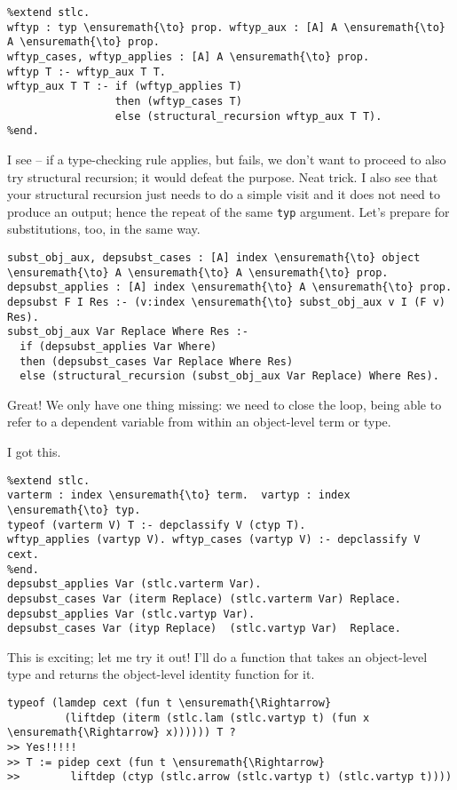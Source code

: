 \begin{verbatim}
%extend stlc.
wftyp : typ \ensuremath{\to} prop. wftyp_aux : [A] A \ensuremath{\to} A \ensuremath{\to} prop.
wftyp_cases, wftyp_applies : [A] A \ensuremath{\to} prop.
wftyp T :- wftyp_aux T T.
wftyp_aux T T :- if (wftyp_applies T)
                 then (wftyp_cases T)
                 else (structural_recursion wftyp_aux T T).
%end.
\end{verbatim}

\heroSTUDENT{} I see -- if a type-checking rule applies, but fails, we don't
want to proceed to also try structural recursion; it would defeat the
purpose. Neat trick. I also see that your structural recursion just
needs to do a simple visit and it does not need to produce an output;
hence the repeat of the same \texttt{typ} argument. Let's prepare for
substitutions, too, in the same way.

\begin{verbatim}
subst_obj_aux, depsubst_cases : [A] index \ensuremath{\to} object \ensuremath{\to} A \ensuremath{\to} A \ensuremath{\to} prop.
depsubst_applies : [A] index \ensuremath{\to} A \ensuremath{\to} prop.
depsubst F I Res :- (v:index \ensuremath{\to} subst_obj_aux v I (F v) Res).
subst_obj_aux Var Replace Where Res :-
  if (depsubst_applies Var Where)
  then (depsubst_cases Var Replace Where Res)
  else (structural_recursion (subst_obj_aux Var Replace) Where Res).
\end{verbatim}

\heroADVISOR{} Great! We only have one thing missing: we need to close the
loop, being able to refer to a dependent variable from within an
object-level term or type.

\heroSTUDENT{} I got this.

\begin{verbatim}
%extend stlc.
varterm : index \ensuremath{\to} term.  vartyp : index \ensuremath{\to} typ.
typeof (varterm V) T :- depclassify V (ctyp T).
wftyp_applies (vartyp V). wftyp_cases (vartyp V) :- depclassify V cext.
%end.
depsubst_applies Var (stlc.varterm Var).
depsubst_cases Var (iterm Replace) (stlc.varterm Var) Replace.
depsubst_applies Var (stlc.vartyp Var).
depsubst_cases Var (ityp Replace)  (stlc.vartyp Var)  Replace.
\end{verbatim}

\heroADVISOR{} This is exciting; let me try it out! I'll do a function that
takes an object-level type and returns the object-level identity
function for it.

\begin{verbatim}
typeof (lamdep cext (fun t \ensuremath{\Rightarrow}
         (liftdep (iterm (stlc.lam (stlc.vartyp t) (fun x \ensuremath{\Rightarrow} x)))))) T ?
>> Yes!!!!!
>> T := pidep cext (fun t \ensuremath{\Rightarrow}
>>        liftdep (ctyp (stlc.arrow (stlc.vartyp t) (stlc.vartyp t))))
\end{verbatim}

